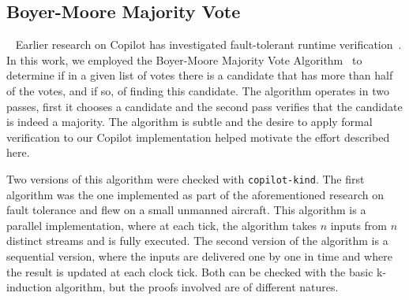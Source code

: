 \subsection{Boyer-Moore Majority Vote}~\label{sec:mvote}
Earlier research on Copilot  has investigated fault-tolerant
runtime verification~\cite{pike-isse-13}. In this work, we employed the Boyer-Moore
Majority Vote Algorithm~\cite{MooreBoyer82,Hesselink2005} to determine
if in a given list of votes there is a candidate that has more than
half of the votes, and if so, of finding this candidate. The algorithm
operates in two passes, first it chooses a candidate and the second
pass verifies that the candidate is indeed a majority.  The algorithm
is subtle and the desire to apply formal verification to our Copilot
implementation helped motivate the effort described here.   




%



Two versions of this algorithm were checked with
\texttt{copilot-kind}. The first algorithm was the one implemented as
part of the aforementioned research on fault tolerance and flew on a
small unmanned aircraft. This algorithm 
is a parallel implementation, where at each tick, the
algorithm takes $n$ inputs from $n$ distinct streams and is fully
executed. The second version of the algorithm  is a sequential version, where the inputs are
delivered one by one in time and where the result is updated at each
clock tick. Both can be checked with the basic k-induction algorithm,
but the proofs involved are of different natures.


